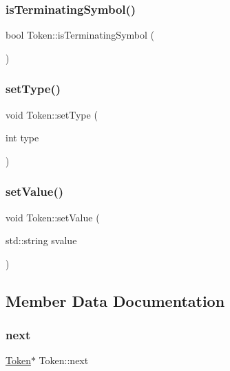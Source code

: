 \subsubsection{\texorpdfstring{is\+Terminating\+Symbol()}{isTerminatingSymbol()}}
{\footnotesize\ttfamily bool Token\+::is\+Terminating\+Symbol (\begin{DoxyParamCaption}{ }\end{DoxyParamCaption})}

\mbox{\label{classToken_a6bf54cdc17cec9c64eeefaf756c260d6}} 
\subsubsection{\texorpdfstring{set\+Type()}{setType()}}
{\footnotesize\ttfamily void Token\+::set\+Type (\begin{DoxyParamCaption}\item[{int}]{type }\end{DoxyParamCaption})}

\mbox{\label{classToken_a0c3a53668483200013e6a2c296fb15c1}} 
\subsubsection{\texorpdfstring{set\+Value()}{setValue()}}
{\footnotesize\ttfamily void Token\+::set\+Value (\begin{DoxyParamCaption}\item[{std\+::string}]{svalue }\end{DoxyParamCaption})}



\subsection{Member Data Documentation}
\mbox{\label{classToken_a32f24a25af788c192e5b387dc8d67914}} 
\subsubsection{\texorpdfstring{next}{next}}
{\footnotesize\ttfamily \hyperlink{classToken}{Token}$\ast$ Token\+::next}


